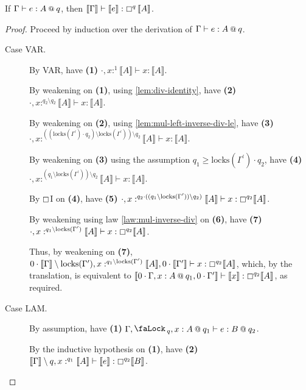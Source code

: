 \documentclass[acmsmall,screen,nonacm]{acmart}
\makeatletter
\newcommand{\at}{\mathbin{\mbox{\small\ensuremath{@}}}}
\newcommand{\tee}{\vdash}
\DeclareMathOperator{\lock}{\tikz{\node[scale=1, line width=0pt, inner sep=0pt] at (0,0) {\faLock\,};}}
\newcommand{\sem}[1]{\llbracket #1 \rrbracket}
\makeatother
\begin{document}
\begin{theorem}
\label{thm:mode-qualifiers-to-graded-modal}
  If $\Gamma \tee e : A \at q$, then $\sem{\Gamma} \tee \sem{e} : \boxempty^{q}\, \sem{A}$.
\end{theorem}

\begin{proof}
  Proceed by induction over the derivation of $\Gamma \tee e : A \at q$.
  \begin{description}
    \item[Case VAR.]
    By VAR, have \textbf{(1)} $\cdot, x :^1 \sem{A} \tee x : \sem{A}$.

    By weakening on \textbf{(1)}, using \ref{lem:div-identity}, have \textbf{(2)} $\cdot, x :^{q_2 \setminus q_2} \sem{A} \tee x : \sem{A}$.
    
    By weakening on \textbf{(2)}, using \ref{lem:mul-left-inverse-div-le}, have \textbf{(3)} $\cdot, x :^{((\mathrm{locks}(\Gamma^\prime) \cdot q_2) \setminus \mathrm{locks}(\Gamma^\prime)) \setminus q_2} \sem{A} \tee x : \sem{A}$.
    
    By weakening on \textbf{(3)} using the assumption $q_1 \ge \mathrm{locks}(\Gamma^\prime) \cdot q_2$, have \textbf{(4)} $\cdot, x :^{(q_1 \setminus \mathrm{locks}(\Gamma^\prime)) \setminus q_2} \sem{A} \tee x : \sem{A}$.
    
    By $\boxempty$I on \textbf{(4)}, have \textbf{(5)} $\cdot, x :^{q_2 \cdot ((q_1 \setminus \mathrm{locks}(\Gamma^\prime)) \setminus q_2)} \sem{A} \tee x : \boxempty^{q_2} \sem{A}$.
    
    By weakening using law \ref{law:mul-inverse-div} on \textbf{(6)}, have \textbf{(7)} $\cdot, x :^{q_1 \setminus \mathrm{locks}(\Gamma^\prime)} \sem{A} \tee x : \boxempty^{q_2} \sem{A}$.
    
    Thus, by weakening on \textbf{(7)}, $0 \cdot \sem{\Gamma} \setminus \mathrm{locks}(\Gamma^\prime), x :^{q_1 \setminus \mathrm{locks}(\Gamma^\prime)} \sem{A}, 0 \cdot \sem{\Gamma^\prime} \tee x : \boxempty^{q_2} \sem{A}$, which, by the translation, is equivalent to $\sem{0 \cdot \Gamma, x : A \at q_1, 0 \cdot \Gamma^\prime} \tee \sem{x} : \boxempty^{q_2} \sem{A}$, as required.
    \\
    \item[Case LAM.]
    By assumption, have \textbf{(1)} $\Gamma, \lock_q, x : A \at q_1 \tee e : B \at q_2$.
    
    By the inductive hypothesis on \textbf{(1)}, have \textbf{(2)} $\sem{\Gamma} \setminus q, x :^{q_1} \sem{A} \tee \sem{e} : \boxempty^{q_2} \sem{B}$.
    

\end{description}
\end{proof}
\end{document}
